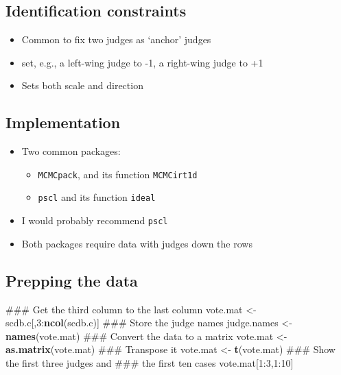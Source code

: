 \documentclass[12pt,twoside]{article}
\newenvironment{Shaded}{}{}
\newcommand{\KeywordTok}[1]{\textcolor[rgb]{0.00,0.44,0.13}{\textbf{{#1}}}}
\newcommand{\DecValTok}[1]{\textcolor[rgb]{0.25,0.63,0.44}{{#1}}}
\newcommand{\StringTok}[1]{\textcolor[rgb]{0.25,0.44,0.63}{{#1}}}
\newcommand{\NormalTok}[1]{{#1}}
\providecommand{\tightlist}{%
  \setlength{\itemsep}{0pt}\setlength{\parskip}{0pt}}
\begin{document}
\subsection{Identification
constraints}\label{identification-constraints}

\begin{itemize}
\tightlist
\item
  Common to fix two judges as `anchor' judges
\item
  set, e.g., a left-wing judge to -1, a right-wing judge to +1
\item
  Sets both scale and direction
\end{itemize}

\subsection{Implementation}\label{implementation}

\begin{itemize}
\tightlist
\item
  Two common packages:

  \begin{itemize}
  \tightlist
  \item
    \texttt{MCMCpack}, and its function \texttt{MCMCirt1d}
  \item
    \texttt{pscl} and its function \texttt{ideal}
  \end{itemize}
\item
  I would probably recommend \texttt{pscl}
\item
  Both packages require data with judges down the rows
\end{itemize}

\subsection{Prepping the data}\label{prepping-the-data}

\begin{Shaded}
\begin{Highlighting}[]
\NormalTok{### Get the third column to the last column}
\NormalTok{vote.mat <-}\StringTok{ }\NormalTok{scdb.c[,}\DecValTok{3}\NormalTok{:}\KeywordTok{ncol}\NormalTok{(scdb.c)]}
\NormalTok{### Store the judge names}
\NormalTok{judge.names <-}\StringTok{ }\KeywordTok{names}\NormalTok{(vote.mat)}
\NormalTok{### Convert the data to a matrix}
\NormalTok{vote.mat <-}\StringTok{ }\KeywordTok{as.matrix}\NormalTok{(vote.mat)}
\NormalTok{### Transpose it}
\NormalTok{vote.mat <-}\StringTok{ }\KeywordTok{t}\NormalTok{(vote.mat)}
\NormalTok{### Show the first three judges and}
\NormalTok{### the first ten cases}
\NormalTok{vote.mat[}\DecValTok{1}\NormalTok{:}\DecValTok{3}\NormalTok{,}\DecValTok{1}\NormalTok{:}\DecValTok{10}\NormalTok{]}
\end{Highlighting}
\end{Shaded}
\end{document}
